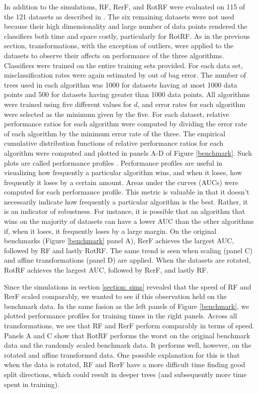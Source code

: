 \documentclass[10pt]{article}
\begin{document}
In addition to the simulations, RF, RerF, and RotRF were evaluated on 115 of the 121 datasets as described in \cite{Delgado2014}. The six remaining datasets were not used because their high dimensionality and large number of data points rendered the classifiers both time and space costly, particularly for RotRF. As in the previous section, transformations, with the exception of outliers, were applied to the datasets to observe their affects on performance of the three algorithms. Classifiers were trained on the entire training sets provided. For each data set, misclassification rates were again estimated by out of bag error. The number of trees used in each algorithm was 1000 for datasets having at most 1000 data points and 500 for datasets having greater than 1000 data points. All algorithms were trained using five different values for $d$, and error rates for each algorithm were selected as the minimum given by the five. For each dataset, relative performance ratios for each algorithm were computed by dividing the error rate of each algorithm by the minimum error rate of the three. The empirical cumulative distribution functions of relative performance ratios for each algorithm were computed and plotted in panels A-D of Figure \ref{benchmark}. Such plots are called performance profiles \cite{Dolan2002}. Performance profiles are useful in visualizing how frequently a particular algorithm wins, and when it loses, how frequently it loses by a certain amount. Areas under the curves (AUCs) were computed for each performance profile. This metric is valuable in that it doesn't necessarily indicate how frequently a particular algorithm is the best. Rather, it is an indicator of robustness. For instance, it is possible that an algorithm that wins on the majority of datasets can have a lower AUC than the other algorithms if, when it loses, it frequently loses by a large margin. On the original benchmarks (Figure \ref{benchmark} panel A), RerF achieves the largest AUC, followed by RF and lastly RotRF. The same trend is seen when scaling (panel C) and affine transformations (panel D) are applied. When the datasets are rotated, RotRF achieves the largest AUC, followed by RerF, and lastly RF.

Since the simulations in section \ref{section: sims} revealed that the speed of RF and RerF scaled comparably, we wanted to see if this observation held on the benchmark data. In the same fasion as the left panels of Figure \ref{benchmark}, we plotted performance profiles for training times in the right panels. Across all transformations, we see that RF and RerF perform comparably in terms of speed. Panels A and C show that RotRF performs the worst on the original benchmark data and the randomly scaled benchmark data. It performs well, however, on the rotated and affine transformed data. One possible explanation for this is that when the data is rotated, RF and RerF have a more difficult time finding good split directions, which could result in deeper trees (and subsequently more time spent in training).  
\end{document}
